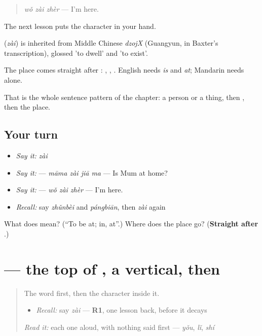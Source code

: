 \begin{quote}
\textbf{} \emph{wǒ zài zhèr} — I'm here.
\end{quote}

The next lesson puts the character in your hand.

\begin{cousinweb}
\textbf{} (\emph{zài}) is inherited from Middle Chinese \emph{dzojX} (Guangyun, in Baxter's transcription), glossed 'to dwell' and 'to exist'.
\end{cousinweb}

\begin{grammarlens}[title={What you've built}]
The place comes straight after : , , . English needs \emph{is} and \emph{at}; Mandarin needs  alone.

That is the whole sentence pattern of the chapter: a person or a thing, then , then the place.
\end{grammarlens}

\subsection*{Your turn}
\begin{itemize}
\raggedright
  \item \emph{Say it:} \emph{zài}
  \item \emph{Say it:}  — \emph{māma zài jiā ma} — Is Mum at home?
  \item \emph{Say it:}  — \emph{wǒ zài zhèr} — I'm here.
  \item \emph{Recall:} say \emph{zhǔnbèi} and \emph{pángbiān}, then \emph{zài} again
\end{itemize}

\begin{tcolorbox}[breakable,colback=teal!4,colframe=teal!35!black,title={Before you move on}]
What does  mean? (\textquotedblleft{}To be at; in, at\textquotedblright{}.) Where does the place go? (\textbf{Straight after }.)
\end{tcolorbox}
\section[\texorpdfstring{\zh{在} (zài)}{在 (zài)}]{ — the top of , a vertical, then }

\label{lesson:ZH-W85-zai-at}



\begin{quote}
The word first, then the character inside it.

\begin{itemize}
\raggedright
  \item \emph{Recall:} say \emph{zài} — \textbf{R1}, one lesson back, before it decays
\end{itemize}

\begin{quote}
  
\end{quote}

\emph{Read it:} each one aloud, with nothing said first — \emph{yǒu}, \emph{lǐ}, \emph{shí}
\end{quote}

